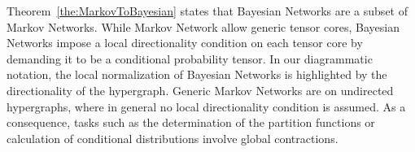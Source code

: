 
Theorem~\ref{the:MarkovToBayesian} states that Bayesian Networks are a subset of Markov Networks.
While Markov Network allow generic tensor cores, Bayesian Networks impose a local directionality condition on each tensor core by demanding it to be a conditional probability tensor.
In our diagrammatic notation, the local normalization of Bayesian Networks is highlighted by the directionality of the hypergraph.
Generic Markov Networks are on undirected hypergraphs, where in general no local directionality condition is assumed.
As a consequence, tasks such as the determination of the partition functions or calculation of conditional distributions involve global contractions.





